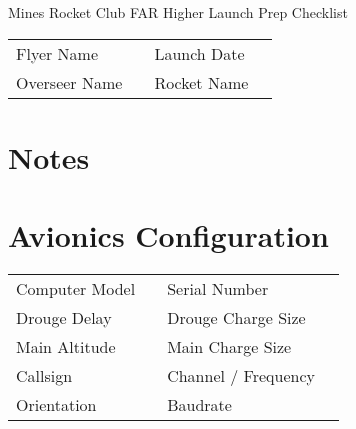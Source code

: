 \documentclass[12pt]{article}
\begin{document}
\pagestyle{fancy}
\begin{center}
	{\center \Large Mines Rocket Club FAR Higher Launch Prep Checklist}\newline
\end{center}
\begin{tabular}{lclc}
	Flyer Name    & \framebox[45mm]{\rule{0pt}{7.5mm} Will Swegles} & Launch Date & \framebox[45mm]{\rule{0pt}{7.5mm} 2024-6-15}\\
	Overseer Name & \framebox[45mm]{\rule{0pt}{7.5mm}} & Rocket Name & \framebox[45mm]{\rule{0pt}{7.5mm} FAR Higher}\\
\end{tabular}
\section*{Notes}
\framebox[7in]{\rule{0pt}{2in}}
\section*{Avionics Configuration}
\begin{tabular}{lclc}
	Computer Model    & \framebox[45mm]{\rule{0pt}{7.5mm}} & Serial Number & \framebox[45mm]{\rule{0pt}{7.5mm}}\\
	Drouge Delay    & \framebox[45mm]{\rule{0pt}{7.5mm}} & Drouge Charge Size & \framebox[45mm]{\rule{0pt}{7.5mm}}\\
	Main Altitude & \framebox[45mm]{\rule{0pt}{7.5mm}} & Main Charge Size & \framebox[45mm]{\rule{0pt}{7.5mm}}\\
	Callsign & \framebox[45mm]{\rule{0pt}{7.5mm}} & Channel / Frequency & \framebox[45mm]{\rule{0pt}{7.5mm}}\\
	Orientation & \framebox[45mm]{\rule{0pt}{7.5mm}} & Baudrate & \framebox[45mm]{\rule{0pt}{7.5mm}}\\
\end{tabular}
\end{document}
